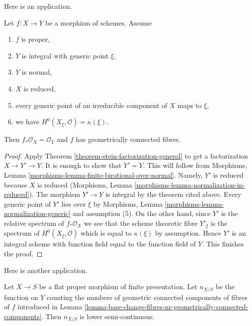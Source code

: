 \noindent
Here is an application.

\begin{lemma}
\label{lemma-geometrically-connected-fibres-towards-normal}
Let $f : X \to Y$ be a morphism of schemes. Assume
\begin{enumerate}
\item $f$ is proper,
\item $Y$ is integral with generic point $\xi$,
\item $Y$ is normal,
\item $X$ is reduced,
\item every generic point of an irreducible component of $X$ maps to $\xi$,
\item we have $H^0(X_\xi, \mathcal{O}) = \kappa(\xi)$.
\end{enumerate}
Then $f_*\mathcal{O}_X = \mathcal{O}_Y$ and $f$
has geometrically connected fibres.
\end{lemma}

\begin{proof}
Apply Theorem \ref{theorem-stein-factorization-general} to get a
factorization $X \to Y' \to Y$. It is enough to show that $Y' = Y$.
This will follow from Morphisms, Lemma
\ref{morphisms-lemma-finite-birational-over-normal}.
Namely, $Y'$ is reduced because $X$ is reduced
(Morphisms, Lemma \ref{morphisms-lemma-normalization-in-reduced}).
The morphism $Y' \to Y$ is integral by the theorem cited above.
Every generic point of $Y'$ lies over $\xi$ by
Morphisms, Lemma \ref{morphisms-lemma-normalization-generic}
and assumption (5). On the other hand, since $Y'$ is the relative
spectrum of $f_*\mathcal{O}_X$ we see that the scheme theoretic fibre
$Y'_\xi$ is the spectrum of $H^0(X_\xi, \mathcal{O})$ which is
equal to $\kappa(\xi)$ by assumption. Hence $Y'$ is an integral
scheme with function field equal to the function field of $Y$.
This finishes the proof.
\end{proof}

\noindent
Here is another application.

\begin{lemma}
\label{lemma-proper-flat-nr-geom-conn-comps-lower-semicontinuous}
Let $X \to S$ be a flat proper morphism of finite presentation. Let
$n_{X/S}$ be the function on $Y$ counting the numbers of geometric
connected components of fibres of $f$ introduced in
Lemma \ref{lemma-base-change-fibres-nr-geometrically-connected-components}.
Then $n_{X/S}$ is lower semi-continuous.
\end{lemma}

